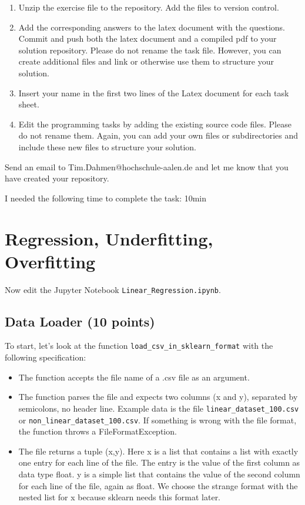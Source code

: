 \begin{enumerate}
\item Unzip the exercise file to the repository. Add the files to version control.  
\item Add the corresponding answers to the latex document with the questions. Commit and push both the latex document and a compiled pdf to your solution repository. Please do not rename the task file. However, you can create additional files and link or otherwise use them to structure your solution. 
\item Insert your name in the first two lines of the Latex document for each task sheet.
\item Edit the programming tasks by adding the existing source code files. Please do not rename them. Again, you can add your own files or subdirectories and include these new files to structure your solution. 
\end{enumerate}

Send an email to Tim.Dahmen@hochschule-aalen.de and let me know that you have created your repository. 

I needed the following time to complete the task: 10min

\section{Regression, Underfitting, Overfitting}

Now edit the Jupyter Notebook \texttt{Linear\_Regression.ipynb}.

\subsection{Data Loader (10 points)}

To start, let's look at the function \texttt{load\_csv\_in\_sklearn\_format} with the following specification:

\begin{itemize}
\item The function accepts the file name of a .csv file as an argument.
\item The function parses the file and expects two columns (x and y), separated by semicolons, no header line. Example data is the file \texttt{linear\_dataset\_100.csv} or \texttt{non\_linear\_dataset\_100.csv}. If something is wrong with the file format, the function throws a FileFormatException.
\item The file returns a tuple (x,y). Here x is a list that contains a list with exactly one entry for each line of the file. The entry is the value of the first column as data type float. y is a simple list that contains the value of the second column for each line of the file, again as float. We choose the strange format with the nested list for x because sklearn needs this format later.
\end{itemize}

